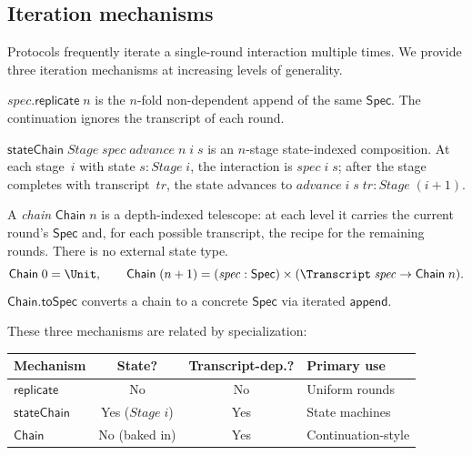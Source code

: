 \subsection{Iteration mechanisms}\label{sec:iteration}

Protocols frequently iterate a single-round interaction multiple times.
We provide three iteration mechanisms at increasing levels of generality.

\begin{definition}
  \label{int:spec-replicate}
  $\mathit{spec}.\mathsf{replicate}\;n$ is the $n$-fold non-dependent append of
  the same $\mathsf{Spec}$.  The continuation ignores the transcript of each
  round.
\end{definition}

\begin{definition}
  \label{int:spec-state-chain}
  $\mathsf{stateChain}\;\mathit{Stage}\;\mathit{spec}\;\mathit{advance}\;n\;i\;s$
  is an $n$-stage state-indexed composition.  At each stage~$i$ with
  state $s : \mathit{Stage}\;i$, the interaction is
  $\mathit{spec}\;i\;s$; after the stage completes with
  transcript~$\mathit{tr}$, the state advances to
  $\mathit{advance}\;i\;s\;\mathit{tr} : \mathit{Stage}\;(i+1)$.
\end{definition}

\begin{definition}
  \label{int:spec-chain}
  A \emph{chain} $\mathsf{Chain}\;n$ is a depth-indexed telescope: at each
  level it carries the current round's $\mathsf{Spec}$ and, for each possible
  transcript, the recipe for the remaining rounds.  There is no external state
  type.
  \[
    \mathsf{Chain}\;0 = \Unit, \qquad
    \mathsf{Chain}\;(n+1) =
      (\mathit{spec} : \mathsf{Spec}) \times
      (\Transcript\;\mathit{spec} \to \mathsf{Chain}\;n).
  \]
  $\mathsf{Chain.toSpec}$ converts a chain to a concrete $\mathsf{Spec}$ via
  iterated $\mathsf{append}$.
\end{definition}

These three mechanisms are related by specialization:
%
\begin{center}
\begin{tabular}{l c c l}
  \textbf{Mechanism} & \textbf{State?} & \textbf{Transcript-dep.?} & \textbf{Primary use} \\
  \hline
  $\mathsf{replicate}$ & No & No & Uniform rounds \\
  $\mathsf{stateChain}$ & Yes ($\mathit{Stage}\;i$) & Yes & State machines \\
  $\mathsf{Chain}$ & No (baked in) & Yes & Continuation-style \\
\end{tabular}
\end{center}

